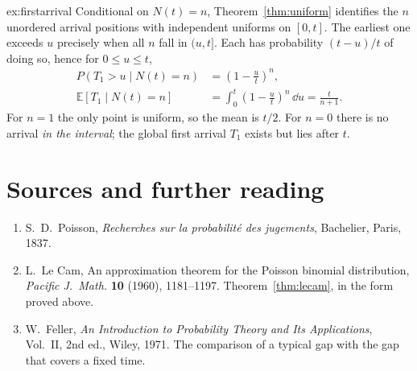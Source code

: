 \begin{solution}{ex:firstarrival}
\writeup Conditional on $N(t)=n$, Theorem~\ref{thm:uniform} identifies the $n$ unordered arrival positions with independent uniforms on $[0,t]$. The earliest one exceeds $u$ precisely when all $n$ fall in $(u,t]$. Each has probability $(t-u)/t$ of doing so, hence for $0\le u\le t$,
\[
\begin{aligned}
 P(T_1>u\mid N(t)=n)&=\left(1-\frac ut\right)^n,\\
 \mathbb E[T_1\mid N(t)=n]
 &=\int_0^t\left(1-\frac ut\right)^n\,\dd u
 =\frac{t}{n+1}.
\end{aligned}
\]
For $n=1$ the only point is uniform, so the mean is $t/2$. For $n=0$ there is no arrival \emph{in the interval}; the global first arrival $T_1$ exists but lies after $t$.
\end{solution}

\section*{Sources and further reading}

\begin{enumerate}
\item S.~D.~Poisson, \emph{Recherches sur la probabilit\'e des jugements}, Bachelier, Paris, 1837.
\item L.~Le Cam, An approximation theorem for the Poisson binomial distribution, \emph{Pacific J.\ Math.} \textbf{10} (1960), 1181--1197. Theorem~\ref{thm:lecam}, in the form proved above.
\item W.~Feller, \emph{An Introduction to Probability Theory and Its Applications}, Vol.~II, 2nd ed., Wiley, 1971. The comparison of a typical gap with the gap that covers a fixed time.
\end{enumerate}
